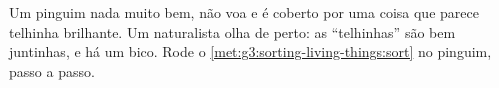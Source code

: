 \begin{exercise}[$\star\star$]\label{exo:g3:sorting-living-things:10}
Um pinguim nada muito bem, não voa e é coberto por uma coisa que
parece telhinha brilhante. Um naturalista olha de perto: as
``telhinhas'' são  bem juntinhas, e há um bico. Rode o
\cref{met:g3:sorting-living-things:sort} no pinguim, passo a passo.
\end{exercise}
